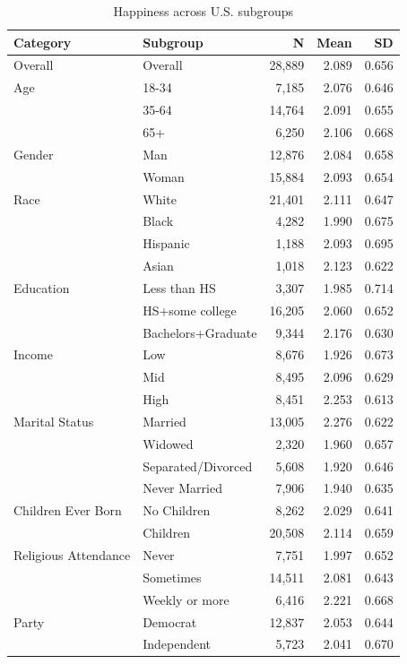 \begin{table}[htbp]
\centering
\caption{Happiness across U.S. subgroups}
\begin{tabular}{llrrr}
\toprule
Category & Subgroup & N & Mean & SD \\
\midrule
Overall & Overall & 28,889 & 2.089 & 0.656 \\
\midrule
Age & 18-34 & 7,185 & 2.076 & 0.646 \\
 & 35-64 & 14,764 & 2.091 & 0.655 \\
 & 65+ & 6,250 & 2.106 & 0.668 \\
\midrule
Gender & Man & 12,876 & 2.084 & 0.658 \\
 & Woman & 15,884 & 2.093 & 0.654 \\
\midrule
Race & White & 21,401 & 2.111 & 0.647 \\
 & Black & 4,282 & 1.990 & 0.675 \\
 & Hispanic & 1,188 & 2.093 & 0.695 \\
 & Asian & 1,018 & 2.123 & 0.622 \\
\midrule
Education & Less than HS & 3,307 & 1.985 & 0.714 \\
 & HS+some college & 16,205 & 2.060 & 0.652 \\
 & Bachelors+Graduate & 9,344 & 2.176 & 0.630 \\
\midrule
Income & Low & 8,676 & 1.926 & 0.673 \\
 & Mid & 8,495 & 2.096 & 0.629 \\
 & High & 8,451 & 2.253 & 0.613 \\
\midrule
Marital Status & Married & 13,005 & 2.276 & 0.622 \\
 & Widowed & 2,320 & 1.960 & 0.657 \\
 & Separated/Divorced & 5,608 & 1.920 & 0.646 \\
 & Never Married & 7,906 & 1.940 & 0.635 \\
\midrule
Children Ever Born & No Children & 8,262 & 2.029 & 0.641 \\
 & Children & 20,508 & 2.114 & 0.659 \\
\midrule
Religious Attendance & Never & 7,751 & 1.997 & 0.652 \\
 & Sometimes & 14,511 & 2.081 & 0.643 \\
 & Weekly or more & 6,416 & 2.221 & 0.668 \\
\midrule
Party & Democrat & 12,837 & 2.053 & 0.644 \\
 & Independent & 5,723 & 2.041 & 0.670 \\

\end{tabular}
\end{table}
